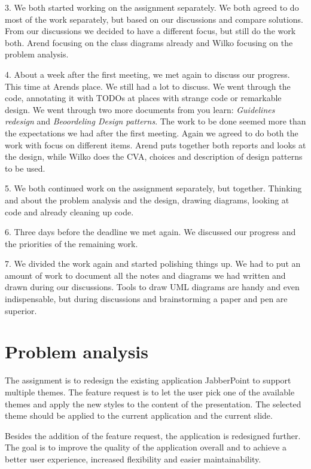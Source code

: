 \documentclass[a4paper]{article}
\begin{document}
3. We both started working on the assignment separately. We both agreed to do most of the work separately, but based on our discussions and compare solutions. From our discussions we decided to have a different focus, but still do the work both. Arend focusing on the class diagrams already and Wilko focusing on the problem analysis.

4. About a week after the first meeting, we met again to discuss our progress. This time at Arends place. We still had a lot to discuss. We went through the code, annotating it with TODOs at places with strange code or remarkable design. We went through two more documents from you learn: \textit{Guidelines redesign} and \textit{Beoordeling Design patterns}. The work to be done seemed more than the expectations we had after the first meeting. Again we agreed to do both the work with focus on different items. Arend puts together both reports and looks at the design, while Wilko does the CVA, choices and description of design patterns to be used.

5. We both continued work on the assignment separately, but together. Thinking and about the problem analysis and the design, drawing diagrams, looking at code and already cleaning up code. 

6. Three days before the deadline we met again. We discussed our progress and the priorities of the remaining work. 

7. We divided the work again and started polishing things up. We had to put an amount of work to document all the notes and diagrams we had written and drawn during our discussions. Tools to draw UML diagrams are handy and even indispensable, but during discussions and brainstorming a paper and pen are superior.

\section{Problem analysis}
The assignment is to redesign the existing application JabberPoint to support multiple themes. The feature request is to let the user pick one of the available themes and apply the new styles to the content of the presentation. The selected theme should be applied to the current application and the current slide.

Besides the addition of the feature request, the application is redesigned further. The goal is to improve the quality of the application overall and to achieve a better user experience, increased flexibility and easier maintainability.  
\end{document}
